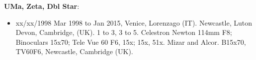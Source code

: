{\bf UMa, Zeta, Dbl Star}:
\begin{itemize}
\item xx/xx/1998 Mar 1998 to Jan 2015, Venice, Lorenzago (IT). Newcastle, Luton Devon, Cambridge, (UK). 1 to 3, 3 to 5. Celestron Newton 114mm F8; Binoculars 15x70; Tele Vue 60 F6, 15x; 15x, 51x. Mizar and Alcor. B15x70, TV60F6, Newcastle, Cambridge (UK).
\end{itemize}

